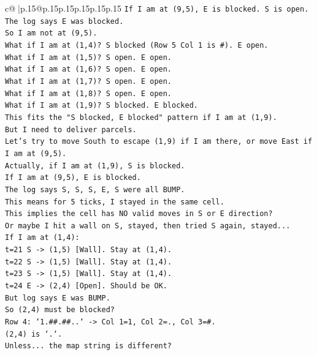 \documentclass{article}
\begin{document}
{\begin{supertabular}{c@{$\;$}|p{.15\linewidth}@{}p{.15\linewidth}p{.15\linewidth}p{.15\linewidth}p{.15\linewidth}p{.15\linewidth}}
{{{\texttt{If I am at (9,5), E is blocked. S is open.} \\
\texttt{The log says E was blocked.} \\
\texttt{So I am not at (9,5).} \\
\texttt{What if I am at (1,4)? S blocked (Row 5 Col 1 is \#). E open.} \\
\texttt{What if I am at (1,5)? S open. E open.} \\
\texttt{What if I am at (1,6)? S open. E open.} \\
\texttt{What if I am at (1,7)? S open. E open.} \\
\texttt{What if I am at (1,8)? S open. E open.} \\
\texttt{What if I am at (1,9)? S blocked. E blocked.} \\
\texttt{This fits the "S blocked, E blocked" pattern if I am at (1,9).} \\
\texttt{But I need to deliver parcels.} \\
\texttt{Let's try to move South to escape (1,9) if I am there, or move East if I am at (9,5).} \\
\texttt{Actually, if I am at (1,9), S is blocked.} \\
\texttt{If I am at (9,5), E is blocked.} \\
\texttt{The log says S, S, S, E, S were all BUMP.} \\
\texttt{This means for 5 ticks, I stayed in the same cell.} \\
\texttt{This implies the cell has NO valid moves in S or E direction?} \\
\texttt{Or maybe I hit a wall on S, stayed, then tried S again, stayed...} \\
\texttt{If I am at (1,4):} \\
\texttt{t=21 S {-}> (1,5) {[}Wall{]}. Stay at (1,4).} \\
\texttt{t=22 S {-}> (1,5) {[}Wall{]}. Stay at (1,4).} \\
\texttt{t=23 S {-}> (1,5) {[}Wall{]}. Stay at (1,4).} \\
\texttt{t=24 E {-}> (2,4) {[}Open{]}. Should be OK.} \\
\texttt{But log says E was BUMP.} \\
\texttt{So (2,4) must be blocked?} \\
\texttt{Row 4: `1.\#\#.\#\#..` {-}> Col 1=1, Col 2=., Col 3=\#.} \\
\texttt{(2,4) is `.`.} \\
\texttt{Unless... the map string is different?} \\
}}}
\end{supertabular}}
\end{document}
